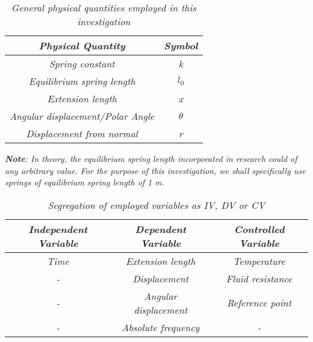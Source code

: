 \begin{table}[H]
    \centering
        \begin{tabular}{|c|c|}
        \hline
        \hline
        \textit{Physical Quantity} & \textit{Symbol} \\
        \hline
        \hline
        \textit{Spring constant} & \textit{k} \\
        \hline
        \textit{Equilibrium spring length} & \textit{$l_0$} \\
        \hline
        \textit{Extension length} & \textit{x} \\
        \hline
        \textit{Angular displacement/Polar Angle} & \textit{$\theta$} \\
        \hline
        \textit{Displacement from normal} & \textit{r} \\
        \hline
        \hline
        \end{tabular}
    \caption{\textit{General physical quantities employed in this investigation}}
\end{table}

\textit{\textbf{Note}: In theory, the equilibrium spring length incorporated in research could of any arbitrary value. For the purpose of this investigation, we shall specifically use springs of equilibrium spring length of 1 m.}

\begin{table}[H]
    \centering
        \begin{tabular}{|c|c|c|}
        \hline
        \hline
        \textit{Independent Variable} & \textit{Dependent Variable} & \textit{Controlled Variable} \\
        \hline
        \hline
        \textit{Time} & \textit{Extension length} & \textit{Temperature} \\
        \hline
        \textit{-} & \textit{Displacement} & \textit{Fluid resistance} \\
        \hline
        \textit{-} & \textit{Angular displacement} & \textit{Reference point} \\
        \hline
        \textit{-} & \textit{Absolute frequency} & \textit{-} \\
        \hline
        \hline
        \end{tabular}
    \caption{\textit{Segregation of employed variables as IV, DV or CV}}
\end{table}

